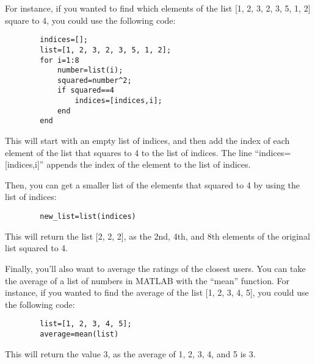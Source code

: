 \documentclass{ximera}
\begin{document}
\begin{exploration}
\begin{problem}
      For instance, if you wanted to find which elements of the list [1, 2, 3, 2, 3, 5, 1, 2] square to 4, you could use the following code:
      \begin{verbatim}
        indices=[];
        list=[1, 2, 3, 2, 3, 5, 1, 2];
        for i=1:8
            number=list(i);
            squared=number^2;
            if squared==4
                indices=[indices,i];
            end
        end
      \end{verbatim}
      
      This will start with an empty list of indices, and then add the index of each element of the list that squares to 4 to the list of indices. The line ``indices=[indices,i]'' appends the index of the element to the list of indices.

      Then, you can get a smaller list of the elements that squared to 4 by using the list of indices:
      \begin{verbatim}
        new_list=list(indices)
      \end{verbatim}
        


      This will return the list [2, 2, 2], as the 2nd, 4th, and 8th elements of the original list squared to 4.

      Finally, you'll also want to average the ratings of the closest users. You can take the average of a list of numbers in MATLAB with the ``mean'' function. For instance, if you wanted to find the average of the list [1, 2, 3, 4, 5], you could use the following code:

      \begin{verbatim}
        list=[1, 2, 3, 4, 5];
        average=mean(list)        
      \end{verbatim}



      This will return the value 3, as the average of 1, 2, 3, 4, and 5 is 3.


    \end{problem}
      
      \end{exploration}
\end{document}
